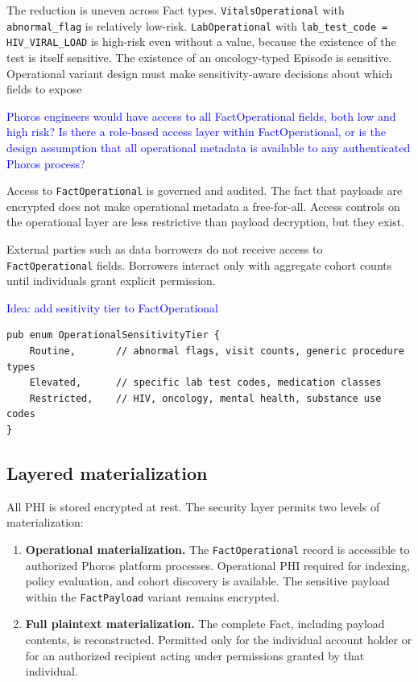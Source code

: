 \documentclass[11pt]{article}
\begin{document}
The reduction is uneven across Fact types. \texttt{VitalsOperational}
with \texttt{abnormal\_flag} is relatively low-risk.
\texttt{LabOperational} with \texttt{lab\_test\_code = HIV\_VIRAL\_LOAD}
is high-risk even without a value, because the existence of the test is
itself sensitive. The existence of an oncology-typed Episode is
sensitive. Operational variant design must make sensitivity-aware
decisions about which fields to expose

\textcolor{blue}{Phoros engineers would have access to all FactOperational fields, both low and high risk? Is there a role-based access layer within FactOperational, or is the design assumption that all operational metadata is available to any authenticated Phoros process?}

Access to \texttt{FactOperational} is governed and audited. The fact
that payloads are encrypted does not make operational metadata a
free-for-all. Access controls on the operational layer are less
restrictive than payload decryption, but they exist.

External parties such as data borrowers do not receive access to
\texttt{FactOperational} fields. Borrowers interact only with aggregate
cohort counts until individuals grant explicit permission.

\textcolor{blue}{Idea: add sesitivity tier to FactOperational}

\begin{verbatim}
pub enum OperationalSensitivityTier {
    Routine,       // abnormal flags, visit counts, generic procedure types
    Elevated,      // specific lab test codes, medication classes
    Restricted,    // HIV, oncology, mental health, substance use codes
}
\end{verbatim}


\subsection{Layered materialization}

All PHI is stored encrypted at rest. The security layer permits two
levels of materialization:

\begin{enumerate}
\item \textbf{Operational materialization.} The \texttt{FactOperational}
  record is accessible to authorized Phoros platform processes.
  Operational PHI required for indexing, policy evaluation, and cohort
  discovery is available. The sensitive payload within the
  \texttt{FactPayload} variant remains encrypted.

\item \textbf{Full plaintext materialization.} The complete Fact,
  including payload contents, is reconstructed. Permitted only for the
  individual account holder or for an authorized recipient acting under
  permissions granted by that individual.
\end{enumerate}
\end{document}
